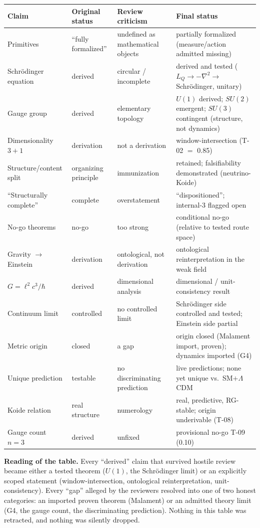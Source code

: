 \documentclass[10pt,twoside,openany]{book}
\begin{document}
\begin{longtable}{p{3.2cm}p{2.4cm}p{3.0cm}p{5.8cm}}
\toprule
Claim & Original status & Review criticism & Final status \\
\midrule
\endhead
Primitives & ``fully formalized'' & undefined as mathematical objects & partially formalized (measure/action admitted missing) \\
Schr\"odinger equation & derived & circular / incomplete & derived and tested ($L_Q\to-\nabla^2\to$ Schr\"odinger, unitary) \\
Gauge group & derived & elementary topology & $U(1)$ derived; $SU(2)$ emergent; $SU(3)$ contingent (structure, not dynamics) \\
Dimensionality $3{+}1$ & derivation & not a derivation & window-intersection (T-02 $=$ 0.85) \\
Structure/content split & organizing principle & immunization & retained; falsifiability demonstrated (neutrino-Koide) \\
``Structurally complete'' & complete & overstatement & ``dispositioned''; internal-3 flagged open \\
No-go theorems & no-go & too strong & conditional no-go (relative to tested route space) \\
Gravity $\to$ Einstein & derivation & ontological, not derivation & ontological reinterpretation in the weak field \\
$G=\ell^2c^3/\hbar$ & derived & dimensional analysis & dimensional / unit-consistency result \\
Continuum limit & controlled & no controlled limit & Schr\"odinger side controlled and tested; Einstein side partial \\
Metric origin & closed & a gap & origin closed (Malament import, proven); dynamics imported (G4) \\
Unique prediction & testable & no discriminating prediction & live predictions; none yet unique vs.\ SM$+\Lambda$CDM \\
Koide relation & real structure & numerology & real, predictive, RG-stable; origin underivable (T-08) \\
Gauge count $n=3$ & derived & unfixed & provisional no-go T-09 (0.10) \\
\bottomrule
\end{longtable}

\textbf{Reading of the table.} Every ``derived'' claim that survived hostile review became
either a tested theorem ($U(1)$, the Schr\"odinger limit) or an explicitly scoped statement
(window-intersection, ontological reinterpretation, unit-consistency). Every ``gap'' alleged
by the reviewers resolved into one of two honest categories: an imported proven theorem
(Malament) or an admitted theory limit (G4, the gauge count, the discriminating
prediction). Nothing in this table was retracted, and nothing was silently dropped.
\end{document}
